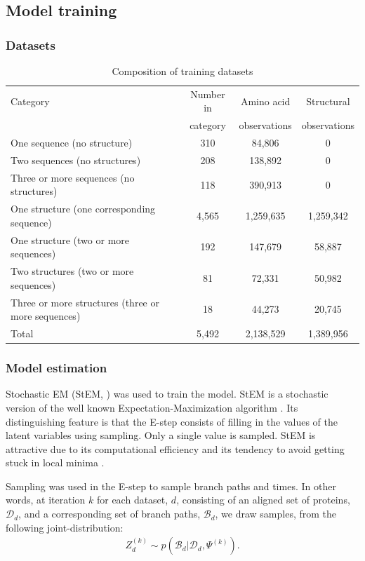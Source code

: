 \documentclass[nogrid]{MBE}%
\begin{document}
\subsection{Model training}

\subsubsection{Datasets}
\begin{table}%
	\centering
	\caption{\label{tab:datasets} Composition of training datasets}
	\begin{tabularx}{0.91\linewidth}{lccc}
		\toprule 
		Category & Number in & Amino acid & Structural\\
		& category & observations & observations\\
		\midrule
		One sequence (no structure) &  310 & 84,806 & 0\\
		Two sequences (no structures) & 208 & 138,892 & 0\\
		Three or more sequences (no structures) & 118 & 390,913 & 0\\
		One structure (one corresponding sequence) & 4,565 & 1,259,635 & 1,259,342\\
		One structure (two or more sequences) &  192 & 147,679 & 58,887\\
		Two structures (two or more sequences) &  81 & 72,331 & 50,982\\
		Three or more structures (three or more sequences) & 18 & 44,273 & 20,745\\
		\midrule
		Total & 5,492 & 2,138,529 & 1,389,956\\
		\bottomrule
	\end{tabularx}
\end{table}

\subsubsection{Model estimation}
Stochastic EM (StEM, \citet{gilks1995markov}) was used to train the model. StEM  is a stochastic version of the well known Expectation-Maximization algorithm \citep{gilks1995markov}. Its distinguishing feature is that the E-step consists of filling in the values of the latent variables using sampling. Only a single value is sampled. StEM is attractive due to its computational efficiency and its tendency to avoid getting stuck in local minima \citep{gilks1995markov}.

Sampling was used in the E-step to sample branch paths and times. In other words, at iteration $k$ for each dataset, $d$, consisting of an aligned set of proteins, $\mathcal{D}_d$,  and a corresponding set of branch paths, $\mathcal{B}_d$, we draw samples, from the following joint-distribution:
\begin{align*}
Z_{d}^{(k)}\sim p(\mathcal{B}_d|\mathcal{D}_d,\Psi^{(k)}).
\end{align*}
\end{document}
